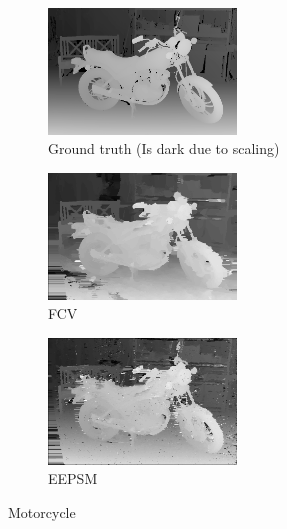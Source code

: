 \begin{figure}[ht]
  \centering
  \begin{subfigure}[t]{0.3\textwidth}
    \centering\includegraphics[width=5cm]{figures/mot_gt.png}
    \caption{Ground truth \cite{Scharstein2014} (Is dark due to scaling) \label{fig:mot_gt}}
  \end{subfigure}\hspace{0.5cm}
  \begin{subfigure}[t]{0.3\textwidth}
    \centering\includegraphics[width=5cm]{figures/mot_fcv}
    \caption{FCV\label{fig:mot_fcv}}
  \end{subfigure}\hspace{0.5cm}
  \begin{subfigure}[t]{0.3\textwidth}
    \centering\includegraphics[width=5cm]{figures/mot_eepsm1}
    \caption{EEPSM\label{fig:mot_eepsm}}
  \end{subfigure}
  \caption{Motorcycle\label{fig:motall}}
\end{figure}

